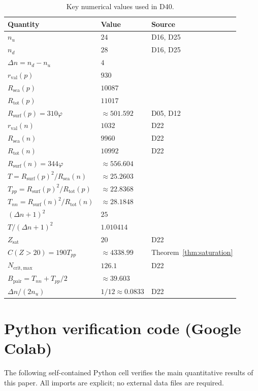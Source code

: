 \documentclass{article}
\theoremstyle{remark}
\newcommand{\Rsurf}{R_{\mathrm{surf}}}
\newcommand{\Rsea}{R_{\mathrm{sea}}}
\newcommand{\Rtot}{R_{\mathrm{tot}}}
\newcommand{\rval}{r_{\mathrm{val}}}
\newcommand{\Tpp}{T_{pp}}
\newcommand{\Tnn}{T_{nn}}
\newcommand{\Zsat}{Z_{\mathrm{sat}}}
\newcommand{\Deltanop}{\Delta n}
\newcommand{\vp}{\varphi}
\newcommand{\Bpair}{B_{\mathrm{pair}}}
\begin{document}
\begin{table}[ht]
\centering
\caption{Key numerical values used in D40.}
\label{tab:numerics}
\begin{tabular}{lll}
\toprule
Quantity & Value & Source \\
\midrule
$n_u$ & $24$ & D16, D25~\cite{D16,D25} \\
$n_d$ & $28$ & D16, D25 \\
$\Deltanop = n_d - n_u$ & $4$ & \\
$\rval(p)$ & $930$ & \\
$\Rsea(p)$ & $10087$ & \\
$\Rtot(p)$ & $11017$ & \\
$\Rsurf(p) = 310\vp$ & $\approx 501.592$ & D05, D12~\cite{D05,D12} \\
$\rval(n)$ & $1032$ & D22~\cite{D22} \\
$\Rsea(n)$ & $9960$ & D22 \\
$\Rtot(n)$ & $10992$ & D22 \\
$\Rsurf(n) = 344\vp$ & $\approx 556.604$ & \\
$T = \Rsurf(p)^2/\Rsea(n)$ & $\approx 25.2603$ & \\
$\Tpp = \Rsurf(p)^2/\Rtot(p)$ & $\approx 22.8368$ & \\
$\Tnn = \Rsurf(n)^2/\Rtot(n)$ & $\approx 28.1848$ & \\
$(\Deltanop+1)^2$ & $25$ & \\
$T/(\Deltanop+1)^2$ & $1.010414$ & \\
$\Zsat$ & $20$ & D22 \\
$C(Z > 20) = 190\Tpp$ & $\approx 4338.99$ & Theorem~\ref{thm:saturation} \\
$N_{\mathrm{crit,max}}$ & $126.1$ & D22 \\
$\Bpair = \Tnn + \Tpp/2$ & $\approx 39.603$ & \\
$\Deltanop/(2n_u)$ & $1/12 \approx 0.0833$ & D22 \\
\bottomrule
\end{tabular}
\end{table}

\section{Python verification code (Google Colab)}
\label{app:colab}

The following self-contained Python cell verifies the main quantitative results of this paper. All imports are explicit; no external data files are required.
\end{document}
